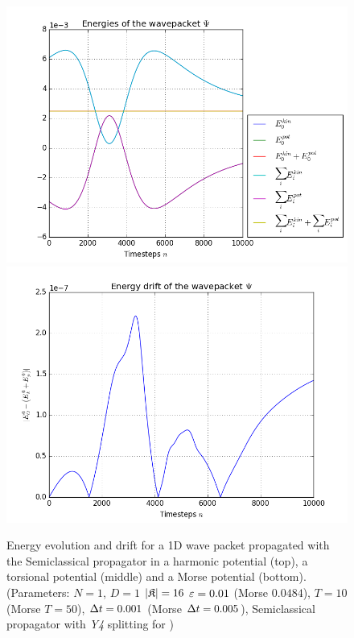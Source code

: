 \begin{figure}[ht]
	\includegraphics[width=.45\textwidth]{figures/morse_1D_Semiclassical_energies.png}
	\includegraphics[width=.45\textwidth]{figures/morse_1D_Semiclassical_drift.png}
	\caption{Energy evolution and drift for a 1D wave packet propagated with the Semiclassical propagator in a harmonic potential (top), a torsional potential (middle) and a Morse potential (bottom).
	(Parameters: $N=1$, $D=1$ $|\mathfrak{K}|=16$ $\varepsilon=0.01$ (Morse $0.0484$), $T=10$ (Morse $T=50$), $\Delta t=0.001$ (Morse $\Delta t=0.005$), Semiclassical propagator with \emph{Y4} splitting for )}
	\label{fig:energy_Semiclassical}
\end{figure}
%
